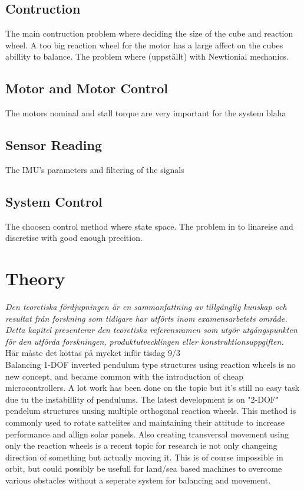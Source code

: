 \documentclass[a4paper,11pt]{kth-mag}
\begin{document}
\section{Contruction}
The main contruction problem where deciding the size of the cube and reaction wheel. A too big reaction wheel for the motor has a large affect on the cubes abillity to balance. The problem where (uppställt) with Newtionial mechanics.
 
\section{Motor and Motor Control}
The motors nominal and stall torque are very important for the system blaha
  
\section{Sensor Reading}
The IMU's parameters and filtering of the signals

\section{System Control}
The choosen control method where state space. The problem in to linareise and discretise with good enough precition.


\chapter{Theory}
\emph{Den teoretiska fördjupningen är en sammanfattning av tillgänglig kunskap och resultat från forskning som tidigare har utförts inom examensarbetets område. Detta kapitel presenterar den teoretiska referensramen som utgör utgångspunkten för den utförda forskningen, produktutvecklingen eller konstruktionsuppgiften.}
\\ Här måste det köttas på mycket inför tisdag 9/3 \\


Balancing 1-DOF inverted pendulum type structures using reaction wheels is no new concept, and became common with the introduction of cheap microcontrollers. A lot work has been done on the topic but it's still no easy task due tu the instabillity of pendulums. The latest development is on "2-DOF" pendelum structures unsing multiple orthogonal reaction wheels. This method is commonly used to rotate sattelites and maintaining their attitude to increase performance and allign solar panels. 
Also creating transversal movement using only the reaction wheels is a recent topic for research ie not only changeing direction of something but actually moving it. This is of course impossible in orbit, but could possibly be usefull for land/sea based machines to overcome various obstacles without a seperate system for balancing and movement.
 
\end{document}
